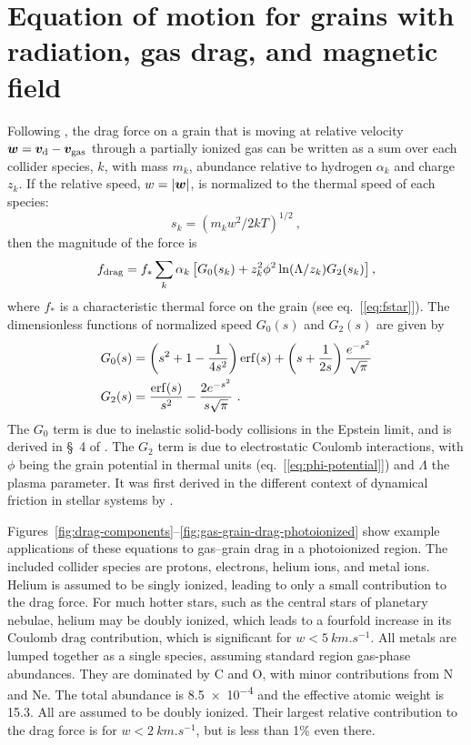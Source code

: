 \section{Equation of motion for grains with radiation, gas drag, and
  magnetic field}
\label{sec:equat-moti-grains}

Following \citet{Draine:1979a}, the drag force on a grain that is
moving at relative velocity \(\bm{w} = \bm{v}_{\text{d}} - \bm{v}_{\text{gas}}\)
through a partially ionized gas can be written as a sum over each
collider species, \(k\), with mass \(m_k\), abundance relative to
hydrogen \(\alpha_k\) and charge \(z_k\). If the relative speed,
\(w = \lvert\bm{w}\rvert\), is normalized to the thermal speed of each
species:
\begin{equation}
  \label{eq:s-velocity}
  s_k = \left( m_k w^2 / 2 k T  \right)^{1/2} \ ,
\end{equation}
then the magnitude of the force is 
\begin{equation}
  \label{eq:ds79}
  f_{\text{drag}} = f_* \sum_k \alpha_k \left[ G_0(s_k) + z_k^2 \phi^2 \ln(\Lambda/z_k) G_2(s_k) \right],
\end{equation}
where \(f_*\) is a characteristic thermal force on the grain (see
eq.~[\ref{eq:fstar}]). The dimensionless functions of normalized speed
\(G_0(s)\) and \(G_2(s)\) are given by
\begin{align}
  \label{eq:G0}
  G_0(s) & = \left( s^2 + 1 - \frac{1}{4 s^2} \right) \erf(s)
  +  \left( s + \frac{1}{2 s} \right) \frac{e^{-s^2}}{\sqrt{\pi}}\\
  \label{eq:G2}
  G_2(s) & = \frac{\erf(s)}{s^2} - \frac{2 e^{-s^2}}{s \sqrt{\pi}} \ .
\end{align}
The \(G_0\) term is due to inelastic solid-body collisions in the
Epstein limit, and is derived in \S~4 of \citet{Baines:1965a}.  The
\(G_2\) term is due to electrostatic Coulomb interactions, with
\(\phi\) being the grain potential in thermal units
(eq.~[\ref{eq:phi-potential}]) and \(\Lambda\) the plasma parameter.  It was
first derived in the different context of dynamical friction in
stellar systems by \citet{Chandrasekhar:1941a}.

Figures~\ref{fig:drag-components}--\ref{fig:gas-grain-drag-photoionized}
show example applications of these equations to gas--grain drag in a
photoionized region.  The included collider species are protons,
electrons, helium ions, and metal ions.  Helium is assumed to be
singly ionized, leading to only a small contribution to the drag
force.  For much hotter stars, such as the central stars of planetary
nebulae, helium may be doubly ionized, which leads to a fourfold
increase in its Coulomb drag contribution, which is significant for
\(w < \SI{5}{km.s^{-1}}\).  All metals are lumped together as a single
species, assuming standard \hii{} region gas-phase abundances.  They
are dominated by C and O, with minor contributions from N and Ne.  The
total abundance is \num{8.5e-4} and the effective atomic weight is
\num{15.3}.  All are assumed to be doubly ionized.  Their largest
relative contribution to the drag force is for
\(w < \SI{2}{km.s^{-1}}\), but is less than 1\% even there.
  
